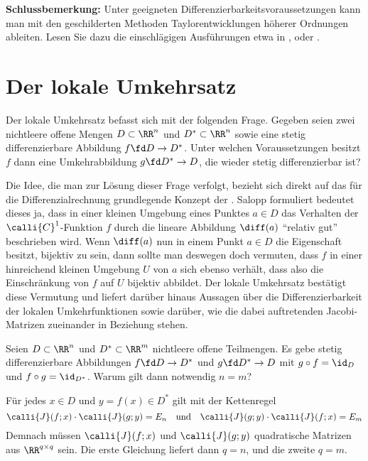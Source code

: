 \bigskip\noindent
\textbf{Schlussbemerkung:} 
Unter geeigneten Differenzierbarkeitsvoraussetzungen kann man mit 
den geschilderten Methoden Taylorentwicklungen höherer Ordnungen ableiten. 
Lesen Sie dazu die einschlägigen Ausführungen etwa in \citep{Kaballo}, \citep{Amann} oder 
\citep{Koenig}.







\section{Der lokale Umkehrsatz}\label{umkehrsatz}

Der lokale Umkehrsatz befasst sich mit der folgenden Frage. 
Gegeben seien zwei nichtleere offene Mengen $D\subset\RR^n$ und 
$D^* \subset \RR^n$ sowie eine stetig differenzierbare Abbildung 
$f \fd D \to D^*$. Unter welchen Voraussetzungen besitzt $f$ dann eine 
Umkehrabbildung $g \fd D^* \to D$, die wieder stetig differenzierbar ist? 

Die Idee, die man zur Lösung dieser Frage verfolgt, 
bezieht sich direkt auf das für die Differenzialrechnung grundlegende 
Konzept der  . 
Salopp formuliert bedeutet dieses ja, dass  
in einer kleinen Umgebung eines Punktes $a\in D$ das Verhalten 
der $\calli{C}^1$-Funktion $f$ durch die lineare Abbildung 
$\diff (a)$ "`relativ gut"' beschrieben wird. Wenn $\diff (a)$ nun in einem 
Punkt $a\in D$ die Eigenschaft besitzt, bijektiv zu sein, dann sollte man 
deswegen doch vermuten, dass $f$ in einer hinreichend kleinen Umgebung $U$ 
von $a$ sich ebenso verhält, dass also 
die Einschränkung von $f$ auf $U$ bijektiv abbildet. Der lokale 
Umkehrsatz bestätigt diese Vermutung und liefert darüber hinaus Aussagen 
über die Differenzierbarkeit der lokalen Umkehrfunktionen sowie darüber, 
wie die dabei auftretenden Jacobi-Matrizen zueinander in Beziehung stehen. 


\begin{frage}\label{10_diffdim}
  Seien $D\subset \RR^n$ und $D^* \subset \RR^m$ nichtleere offene Teilmengen.
  Es gebe stetig differenzierbare Abbildungen 
  $f \fd D \to D^*$ und $g\fd D^* \to D$ mit $g\circ f=\id_D$ und 
  $f\circ g=\id_{D^*}$. Warum gilt dann notwendig $n=m$?
\end{frage}

\begin{antwort}
  Für jedes $x\in D$ und $y=f(x) \in D^*$ gilt mit der Kettenregel
  \[
  \calli{J}(f;x) \cdot \calli{J}(g;y)= E_n \quad\text{und}\quad 
  \calli{J}(g;y) \cdot \calli{J}(f;x)= E_m
  \]
  Demnach müssen $\calli{J}(f;x)$ und $\calli{J}(g;y)$ 
  quadratische Matrizen aus $\RR^{q\times q}$ sein. 
  Die erste Gleichung liefert dann $q=n$, und die zweite 
  $q=m$.   
  \AntEnd
\end{antwort}

